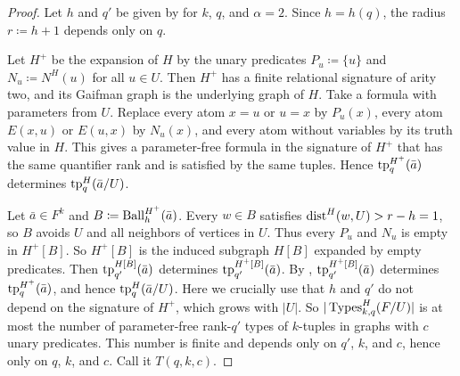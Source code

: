 \begin{proof}
  Let $h$ and $q'$ be given by  for $k$, $q$, and $\alpha=2$.
  Since $h=h(q)$, the radius $r\coloneqq h+1$ depends only on $q$.

  Let $H^+$ be the expansion of $H$ by the unary predicates $P_u\coloneqq\{u\}$ and $N_u\coloneqq N^H(u)$ for all $u\in U$.
  Then $H^+$ has a finite relational signature of arity two, and its Gaifman graph is the underlying graph of $H$.
  Take a formula with parameters from $U$.
  Replace every atom $x=u$ or $u=x$ by $P_u(x)$, every atom $E(x,u)$ or $E(u,x)$ by $N_u(x)$, and every atom without variables by its truth value in $H$.
  This gives a parameter-free formula in the signature of $H^+$ that has the same quantifier rank and is satisfied by the same tuples.
  Hence $\textnormal{tp}^{H^+}_q(\bar a)$ determines $\textnormal{tp}^H_q(\bar a/U)$.

  Let $\bar a\in F^k$ and $B\coloneqq \operatorname{Ball}^{H^+}_h(\bar a)$.
  Every $w\in B$ satisfies $\mathrm{dist}^H(w,U)>r-h=1$, so $B$ avoids $U$ and all neighbors of vertices in $U$.
  Thus every $P_u$ and $N_u$ is empty in $H^+[B]$.
  So $H^+[B]$ is the induced subgraph $H[B]$ expanded by empty predicates.
  Then $\textnormal{tp}^{H[B]}_{q'}(\bar a)$ determines $\textnormal{tp}^{H^+[B]}_{q'}(\bar a)$.
  By , $\textnormal{tp}^{H^+[B]}_{q'}(\bar a)$ determines $\textnormal{tp}^{H^+}_q(\bar a)$, and hence $\textnormal{tp}^H_q(\bar a/U)$.
  Here we crucially use that $h$ and $q'$ do not depend on the signature of $H^+$, which grows with $|U|$.
  So $|\operatorname{Types}^H_{k,q}(F/U)|$ is at most the number of parameter-free rank-$q'$ types of $k$-tuples in graphs with $c$ unary predicates.
  This number is finite and depends only on $q'$, $k$, and $c$, hence only on $q$, $k$, and $c$.
  Call it $T(q,k,c)$.
\end{proof}


